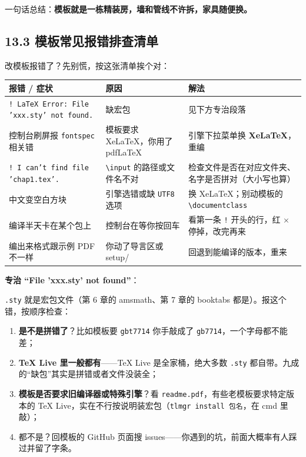 一句话总结：\textbf{模板就是一栋精装房，墙和管线不许拆，家具随便换。}

\subsection*{13.3 模板常见报错排查清单}

改模板报错了？先别慌，按这张清单挨个对：

\begin{table}[htbp]
\centering
\small
\begin{tabularx}{\linewidth}{@{}*{3}{>{\raggedright\arraybackslash}X}@{}}
\toprule
\textbf{报错 / 症状} & \textbf{原因} & \textbf{解法} \\
\midrule
\texttt{! LaTeX Error: File 'xxx.sty' not found.} & 缺宏包 & 见下方专治段落 \\
控制台刷屏报 \texttt{fontspec} 相关错 & 模板要求 XeLaTeX，你用了 pdfLaTeX & 引擎下拉菜单换 \textbf{XeLaTeX}，重编 \\
\texttt{! I can't find file 'chap1.tex'.} & \texttt{\textbackslash{}input} 的路径或文件名不对 & 检查文件是否在对应文件夹、名字是否拼对（大小写也算） \\
中文变空白方块 & 引擎选错或缺 \texttt{UTF8} 选项 & 换 XeLaTeX；别动模板的 \texttt{\textbackslash{}documentclass} \\
编译半天卡在某个包上 & 控制台在等你按回车 & 看第一条 \texttt{!} 开头的行，红 \ensuremath{\times} 停掉，改完再来 \\
编出来格式跟示例 PDF 不一样 & 你动了导言区或 setup/ & 回退到能编译的版本，重来 \\
\bottomrule
\end{tabularx}
\end{table}

\textbf{专治 “File 'xxx.sty' not found”}：

\texttt{.sty} 就是宏包文件（第 6 章的 amsmath、第 7 章的 booktabs 都是）。报这个错，按顺序检查：

\begin{enumerate}
\setlength{\itemsep}{2pt}
\item \textbf{是不是拼错了}？比如模板要 \texttt{gbt7714} 你手敲成了 \texttt{gb7714}，一个字母都不能差；
\item \textbf{TeX Live 里一般都有}——TeX Live 是全家桶，绝大多数 \texttt{.sty} 都自带。九成的“缺包”其实是拼错或者文件没装全；
\item \textbf{模板是否要求旧编译器或特殊引擎}？看 \texttt{readme.pdf}，有些老模板要求特定版本的 TeX Live，实在不行按说明装宏包（\texttt{tlmgr install 包名}，在 cmd 里敲）；
\item 都不是？回模板的 GitHub 页面搜 issues——你遇到的坑，前面大概率有人踩过并留了字条。
\end{enumerate}

